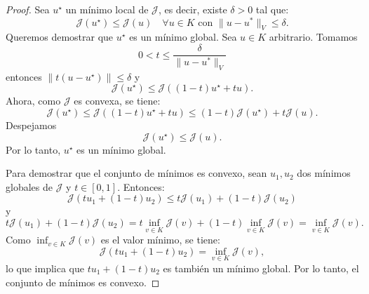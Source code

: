 \documentclass[12pt]{book}
\theoremstyle{definition}
\theoremstyle{plain}
\theoremstyle{remark}
\begin{document}
\begin{proof}
Sea $u^\star$ un mínimo local de $\mathcal{J}$, es decir, existe $\delta > 0$ tal que:
\[
\mathcal{J}(u^\star) \leq \mathcal{J}(u) \quad \forall u \in K \text{ con } \|u - u^*\|_V \leq \delta.
\]
Queremos demostrar que $u^\star$ es un mínimo global. %
%
Sea $u \in K$ arbitrario. 
Tomamos
\[
0 < t \leq \frac{\delta}{\|u - u^*\|_V}
\]
entonces 
$\| t (u -u^\star) \| \leq \delta$
 y
\[
\mathcal{J}(u^\star)
\leq
\mathcal{J}((1-t)u^\star + t u).
\]
Ahora, como $\mathcal{J}$ es convexa, se tiene:
\[
\mathcal{J}(u^\star)
\leq
\mathcal{J}((1-t)u^\star + t u) \leq (1-t)\mathcal{J}(u^\star) + t \mathcal{J}(u).
\]
Despejamos
\[
\mathcal{J}(u^\star)
\leq
\mathcal{J}(u).
\]
%
Por lo tanto, %
$u^\star$ es un mínimo global.

\medskip 

Para demostrar que el conjunto de mínimos es convexo, sean $u_1, u_2$ dos mínimos globales de $\mathcal{J}$ y $t \in [0,1]$. Entonces:
\[
\mathcal{J}(t u_1 + (1-t) u_2) \leq t \mathcal{J}(u_1) + (1-t) \mathcal{J}(u_2) %
\]
y
\[
t \mathcal{J}(u_1) + (1-t) \mathcal{J}(u_2) = t \inf_{v \in K} \mathcal{J}(v) + (1-t) \inf_{v \in K} \mathcal{J}(v) = \inf_{v \in K} \mathcal{J}(v).
\]
Como $\inf_{v \in K} \mathcal{J}(v)$ es el valor mínimo, se tiene:
\[
\mathcal{J}(t u_1 + (1-t) u_2) = \inf_{v \in K} \mathcal{J}(v),
\]
lo que implica que $t u_1 + (1-t) u_2$ es también un mínimo global. Por lo tanto, el conjunto de mínimos es convexo.
\end{proof}
\end{document}

